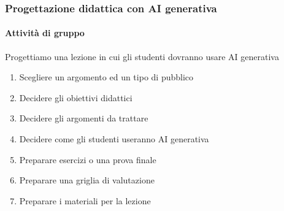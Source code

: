 \begin{exerciseframe}
    \frametitle{Progettazione didattica con AI generativa}
    \framesubtitle{Attività di gruppo}

    Progettiamo una lezione in cui gli studenti dovranno usare AI generativa
    \begin{enumerate}
        \item Scegliere un argomento ed un tipo di pubblico
        \item Decidere gli obiettivi didattici
        \item Decidere gli argomenti da trattare
        \item Decidere come gli studenti useranno AI generativa
        \item Preparare esercizi o una prova finale
        \item Preparare una griglia di valutazione
        \item Preparare i materiali per la lezione
    \end{enumerate}
\end{exerciseframe}